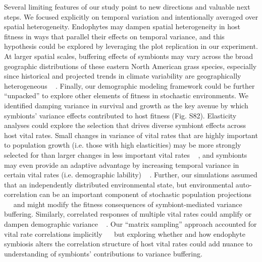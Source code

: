\documentclass[lineno,sn-nature]{sn-jnl}%
\providecommand{\DIFadd}[1]{{\protect\color{blue}#1}} %
\providecommand{\DIFadd}[1]{{\protect\color{blue}\uwave{#1}}} %
\begin{document}
\DIFadd{Several limiting features of our study point to new directions and valuable next steps. 
We focused explicitly on temporal variation and intentionally averaged over spatial heterogeneity. 
Endophytes may dampen spatial heterogeneity in host fitness in ways that parallel their effects on temporal variance, and this hypothesis could be explored by leveraging the plot replication in our experiment. 
At larger spatial scales, buffering effects of symbionts may vary across the broad geographic distributions of these eastern North American grass species, especially since historical and projected trends in climate variability are geographically heterogeneous \mbox{%
\cite{bathiany2018climate}}\hspace{0pt}%
.
Finally, our demographic modeling framework could be further ``unpacked'' to explore other elements of fitness in stochastic environments. 
We identified damping variance in survival and growth as the key avenue by which symbionts' variance effects contributed to host fitness (Fig. S82). 
Elasticity analyses could explore the selection that drives diverse symbiont effects across host vital rates. 
Small changes in variance of vital rates that are highly important to population growth (i.e. those with high elasticities) may be more strongly selected for than larger changes in less important vital rates \mbox{%
\cite{doak2005correctly}}\hspace{0pt}%
, and symbionts may even provide an adaptive advantage by increasing temporal variance in certain vital rates (i.e. demographic lability) \mbox{%
\cite{koons2009life}}\hspace{0pt}%
.
Further, our simulations assumed that an independently distributed environmental state, but environmental auto-correlation can be an important component of stochastic population projections \mbox{%
\cite{tuljapurkar2006temporal} }\hspace{0pt}%
and might modify the fitness consequences of symbiont-mediated variance buffering. 
Similarly, correlated responses of multiple vital rates could amplify or dampen demographic variance \mbox{%
\cite{tuljapurkar2013population,davison2013contributions,compagnoni2016effect}}\hspace{0pt}%
. 
Our ``matrix sampling'' approach accounted for vital rate correlations implicitly \mbox{%
\cite{metcalf2015statistical} }\hspace{0pt}%
but exploring whether and how endophyte symbiosis alters the correlation structure of host vital rates could add nuance to understanding of symbionts' contributions to variance buffering. 

}
\end{document}

